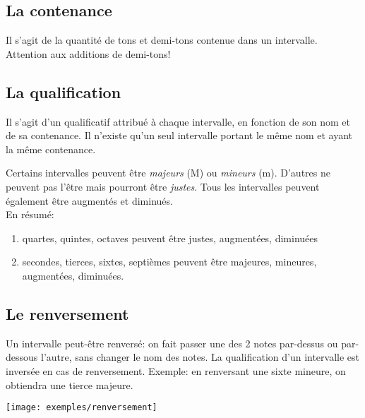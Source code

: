 \subsection{La contenance}
Il s'agit de la quantité de tons et demi-tons contenue dans un intervalle. Attention aux additions de demi-tons!

\subsection{La qualification}
Il s'agit d'un qualificatif attribué à chaque intervalle, en fonction de son nom et de sa contenance. Il n'existe qu'un seul intervalle portant le même nom et ayant la même contenance.

Certains intervalles peuvent être \emph{majeurs} (M) ou \emph{mineurs} (m). D'autres ne peuvent pas l'être mais pourront être \emph{justes}. Tous les intervalles peuvent également être augmentés et diminués.\\


En résumé:
\begin{enumerate}
\item quartes, quintes, octaves peuvent être justes, augmentées, diminuées
\item secondes, tierces, sixtes, septièmes peuvent être majeures, mineures, augmentées, diminuées.
\end{enumerate}

\subsection{Le renversement}
Un intervalle peut-être renversé: on fait passer une des 2 notes par-dessus ou par-dessous l'autre, sans changer le nom des notes. La qualification d'un intervalle est inversée en cas de renversement. Exemple: en renversant une sixte mineure, on obtiendra une tierce majeure.

\centerline{\texttt{[image: exemples/renversement]}}


